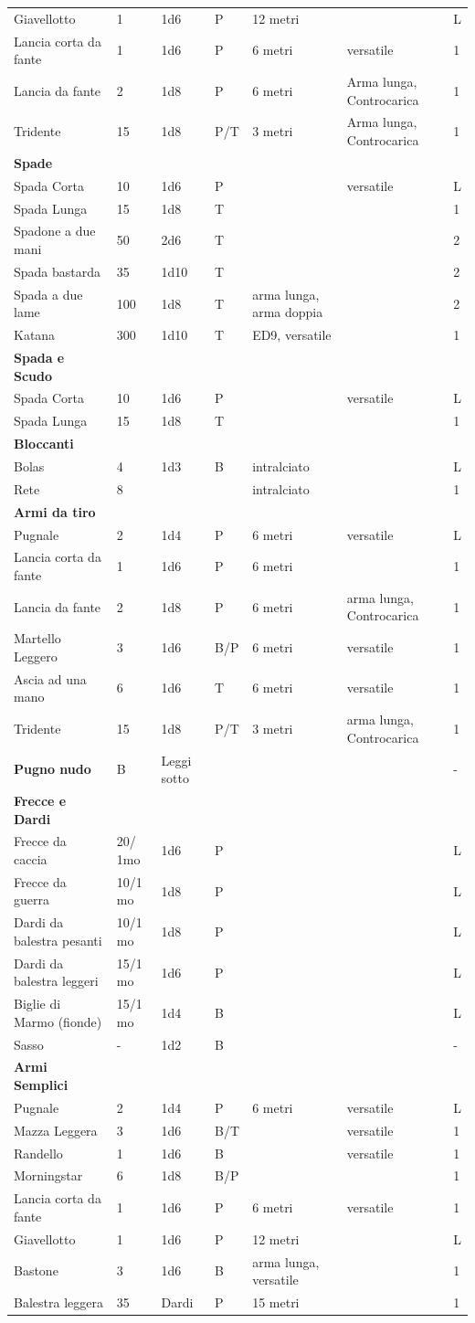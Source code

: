 \documentclass[a4paper,11pt,twoside,openany]{book}
\begin{document}
\begin{longtable}{|L{3.5cm} |k{1,3cm} |k{1.5cm}| k{1.3cm} |L{3.2cm} |k{2.7cm}|k{2cm}|}
	Giavellotto& 1    & 1d6  & P& 12 metri  & & L\tabularnewline
	Lancia corta da fante& 1    & 1d6  & P& 6 metri   & versatile & 1\tabularnewline
	Lancia da fante & 2    & 1d8  & P& 6 metri   & Arma lunga, Controcarica & 1 \tabularnewline
	Tridente   & 15   & 1d8  & P/T   & 3 metri   & Arma lunga, Controcarica & 1\tabularnewline
	\textbf{Spade}  & & &  & & & \tabularnewline
	Spada Corta& 10   & 1d6  & P& & versatile & L\tabularnewline
	Spada Lunga& 15   & 1d8  & T& & & 1 \tabularnewline
	Spadone a due mani   & 50   & 2d6  & T& & & 2\tabularnewline
	Spada bastarda  & 35   & 1d10 & T& & & 2\tabularnewline
	Spada a due lame& 100  & 1d8  & T& arma lunga, arma doppia  & & 2\tabularnewline
	Katana& 300  & 1d10 & T& ED9, versatile & & 1\tabularnewline
	\textbf{Spada e Scudo}    & & &  & & & \tabularnewline
	Spada Corta& 10   & 1d6  & P& & versatile & L\tabularnewline
	Spada Lunga& 15   & 1d8  & T& & & 1\tabularnewline
	\textbf{Bloccanti}   & & &  & & & \tabularnewline
	Bolas & 4    & 1d3  & B& intralciato    & & L\tabularnewline
	Rete  & 8    & &  & intralciato    & & 1\tabularnewline
	\textbf{Armi da tiro}& & &  & & & \tabularnewline
	Pugnale    & 2    & 1d4  & P& 6 metri   & versatile & L\tabularnewline
	Lancia corta da fante& 1    & 1d6  & P& 6 metri   & & 1\tabularnewline
	Lancia da fante & 2    & 1d8  & P& 6 metri   & arma lunga, Controcarica & 1\tabularnewline
	Martello Leggero& 3    & 1d6  & B/P   & 6 metri   & versatile & 1\tabularnewline
	Ascia ad una mano    & 6    & 1d6  & T& 6 metri   & versatile & 1\tabularnewline
	Tridente   & 15   & 1d8  & P/T   & 3 metri   & arma lunga, Controcarica & 1\tabularnewline
	\textbf{Pugno nudo}  & B    & Leggi sotto    &  & & & -\tabularnewline
	\textbf{Frecce e Dardi}   & & &  & & & \tabularnewline
	Frecce da caccia& 20/ 1mo   & 1d6  & P& & & L\tabularnewline
	Frecce da guerra& 10/1 mo   & 1d8  & P& & & L\tabularnewline
	Dardi da balestra pesanti & 10/1 mo   & 1d8  & P& & & L\tabularnewline
	Dardi da balestra leggeri & 15/1 mo   & 1d6  & P& & & L\tabularnewline
	Biglie di Marmo (fionde)  & 15/1 mo   & 1d4  & B& & & L\tabularnewline
	Sasso & -    & 1d2  & B& & & -\tabularnewline
	\textbf{Armi Semplici}    & & &  & & & \tabularnewline
	Pugnale    & 2    & 1d4  & P& 6 metri   & versatile & L\tabularnewline
	Mazza Leggera   & 3    & 1d6  & B/T   & & versatile & 1\tabularnewline
	Randello   & 1    & 1d6  & B& & versatile & 1\tabularnewline
	Morningstar& 6    & 1d8  & B/P   & & & 1\tabularnewline
	Lancia corta da fante& 1    & 1d6  & P& 6 metri   & versatile & 1\tabularnewline
	Giavellotto& 1    & 1d6  & P& 12 metri  & & L\tabularnewline
	Bastone    & 3    & 1d6  & B& arma lunga, versatile    & & 1\tabularnewline
	Balestra leggera& 35   & Dardi& P& 15 metri  & & 1\tabularnewline
\end{longtable}
\end{document}
